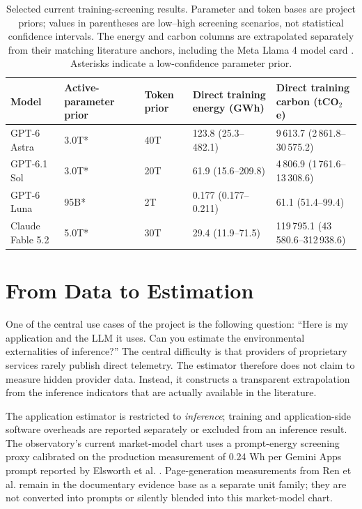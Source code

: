 \documentclass[11pt,a4paper]{article}
\begin{document}
\begin{table}[htbp]
\centering
\small
\begin{tabularx}{\textwidth}{|L{2.5cm}|L{1.7cm}|L{1.3cm}|L{3.6cm}|Y|}
\hline
Model & Active-parameter prior & Token prior & Direct training energy (GWh) & Direct training carbon (tCO$_2$e) \\
\hline
GPT-6 Astra & 3.0T* & 40T & 123.8 (25.3--482.1) & 9\,613.7 (2\,861.8--30\,575.2) \\
\hline
GPT-6.1 Sol & 3.0T* & 20T & 61.9 (15.6--209.8) & 4\,806.9 (1\,761.6--13\,308.6) \\
\hline
GPT-6 Luna & 95B* & 2T & 0.177 (0.177--0.211) & 61.1 (51.4--99.4) \\
\hline
Claude Fable 5.2 & 5.0T* & 30T & 29.4 (11.9--71.5) & 119\,795.1 (43\,580.6--312\,938.6) \\
\hline
\end{tabularx}
\caption{Selected current training-screening results. Parameter and token bases are project priors; values in parentheses are low--high screening scenarios, not statistical confidence intervals. The energy and carbon columns are extrapolated separately from their matching literature anchors, including the Meta Llama 4 model card \cite{meta2025llama4}. Asterisks indicate a low-confidence parameter prior.}
\label{tab:observatory-training}
\end{table}

\section{From Data to Estimation}
One of the central use cases of the project is the following question: ``Here is my application and the LLM it uses. Can you estimate the environmental externalities of inference?'' The central difficulty is that providers of proprietary services rarely publish direct telemetry. The estimator therefore does not claim to measure hidden provider data. Instead, it constructs a transparent extrapolation from the inference indicators that are actually available in the literature.

The application estimator is restricted to \emph{inference}; training and application-side software overheads are reported separately or excluded from an inference result. The observatory's current market-model chart uses a prompt-energy screening proxy calibrated on the production measurement of 0.24 Wh per Gemini Apps prompt reported by Elsworth et al. \cite{elsworth2025}. Page-generation measurements from Ren et al. \cite{ren2024} remain in the documentary evidence base as a separate unit family; they are not converted into prompts or silently blended into this market-model chart.
\end{document}
